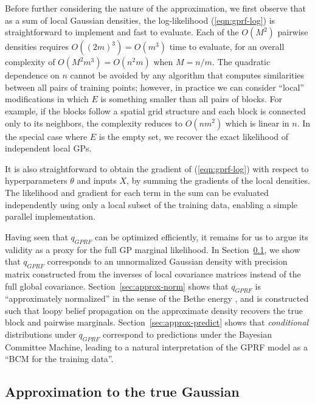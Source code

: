 \documentclass{article}
\begin{document}
Before further considering the nature of the approximation, we first
observe that as a sum of local Gaussian densities, the log-likelihood (\ref{eqn:gprf-log})
is straightforward to implement and fast to evaluate. Each of the $O(M^2)$
pairwise densities requires $O((2m)^3) = O(m^3)$ time to evaluate, for an overall complexity of
$O(M^2m^3) = O(n^2m)$ when $M=n/m$. The quadratic dependence on $n$ cannot
be avoided by any algorithm that computes similarities between all
pairs of training points; however, in practice we can consider ``local''
modifications in which $E$ is something smaller than all
pairs of blocks. For example, if the blocks follow a spatial grid structure and
each block is connected only to its neighbors, the complexity reduces
to $O(nm^2)$ which is linear in $n$. In the special case where $E$ is the empty
set, we recover the exact likelihood of independent local GPs.

It is also straightforward to obtain the gradient of
(\ref{eqn:gprf-log}) with respect to hyperparameters $\theta$ and inputs $X$, by summing
the gradients of the local densities. The likelihood and gradient for each term in the sum
can be evaluated independently using only a local subset of the
training data, enabling a simple parallel implementation. 

Having seen that $q_{GPRF}$ can be optimized efficiently, it remains
for us to argue its validity as a proxy for the full GP marginal
likelihood. In Section~\ref{sec:approx-gaussian}, we show that $q_{GPRF}$ 
corresponds to an unnormalized Gaussian density with precision matrix
constructed from the inverses of local covariance matrices instead of
the full global covariance.  Section~\ref{sec:approx-norm} shows that
$q_{GPRF}$ is ``approximately normalized'' in the sense of the Bethe
energy \cite{bethe}, and is constructed such that loopy belief
propagation on the approximate density recovers the true block and
pairwise marginals. Section~\ref{sec:approx-predict} shows that {\em
  conditional} distributions under $q_{GPRF}$ correspond to
predictions under the Bayesian Committee Machine, leading to a natural
interpretation of the GPRF model as a ``BCM for the training data''.


\subsection{Approximation to the true Gaussian}
\label{sec:approx-gaussian}
\end{document}
